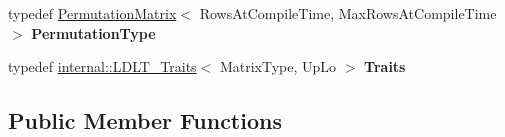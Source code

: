 \begin{DoxyCompactItemize}
\item 
\mbox{\label{class_eigen_1_1_l_d_l_t_a6a901ba1f333313e097ef3aac2164149}} 
typedef \mbox{\hyperlink{class_eigen_1_1_permutation_matrix}{Permutation\+Matrix}}$<$ Rows\+At\+Compile\+Time, Max\+Rows\+At\+Compile\+Time $>$ {\bfseries Permutation\+Type}
\item 
\mbox{\label{class_eigen_1_1_l_d_l_t_a4755ce1400f755d7148cff2872e75d35}} 
typedef \mbox{\hyperlink{struct_eigen_1_1internal_1_1_l_d_l_t___traits}{internal\+::\+L\+D\+L\+T\+\_\+\+Traits}}$<$ Matrix\+Type, Up\+Lo $>$ {\bfseries Traits}
\end{DoxyCompactItemize}
\subsection*{Public Member Functions}
